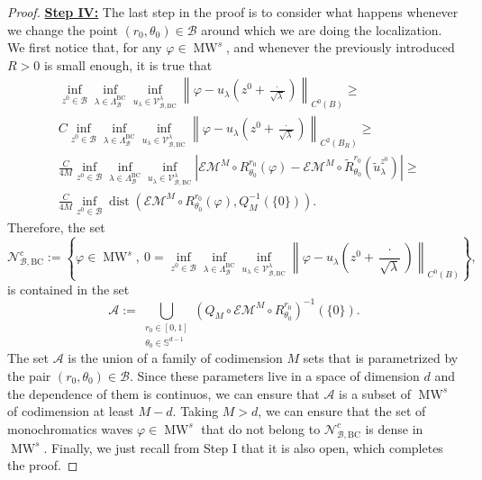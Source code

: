 \documentclass{amsart}
\theoremstyle{definition}
\theoremstyle{remark}
\newcommand{\vp}{\varphi}
\DeclareMathOperator\dist{dist} \DeclareMathOperator\diam{diam}
\renewcommand\geq\geqslant
\numberwithin{equation}{section}
\theoremstyle{definition}
\theoremstyle{remark}
\DeclareMathOperator\MW{MW}
\begin{document}
\begin{proof}
	 \textbf{	\underline{Step IV:}} The last step in the proof is to consider what happens whenever we change the point $(r_0,\theta_0)\in\mathcal{B}$ around which we are doing the localization.  We first notice that, for any $\varphi\in \MW^s$, and whenever the previously introduced $R>0$ is small enough, it is true that	\begin{equation}
		\begin{aligned}
			&\inf_{z^0\in\mathcal{B}}\inf_{\lambda\in\Lambda_{\mathcal{B}}^{\mathrm{BC}}}\inf_{u_\lambda \in\mathcal{V}_{\mathcal{B},\mathrm{BC}}^\lambda}\left\|\varphi-u_\lambda\left(z^0+\frac{\cdot}{\sqrt{\lambda}}\right)\right\|_{C^0\left(B\right)}\geq\\&C\inf_{z^0\in\mathcal{B}}\inf_{\lambda\in\Lambda_{\mathcal{B}}^{\mathrm{BC}}}\inf_{u_\lambda \in\mathcal{V}_{\mathcal{B},\mathrm{BC}}^\lambda}\left\|\varphi-u_\lambda\left(z^0+\frac{\cdot}{\sqrt{\lambda}}\right)\right\|_{C^2\left(B_R\right)}\geq\\&\frac{C}{4M}\inf_{z^0\in\mathcal{B}}\inf_{\lambda\in\Lambda_{\mathcal{B}}^{\mathrm{BC}}}\inf_{u_\lambda \in\mathcal{V}_{\mathcal{B},\mathrm{BC}}^\lambda}\left|\mathcal{EM}^M\circ R_{\theta_0}^{r_0}\left(\varphi\right)-\mathcal{EM}^M\circ\tilde{R}_{\theta_0}^{r_0}\left(\tilde{u}_\lambda^{z^0}\right)\right|\geq\\ &\frac{C}{4M}\inf_{z^0\in\mathcal{B}} \dist\left(\mathcal{EM}^M\circ R_{\theta_0}^{r_0}(\varphi),Q_M^{-1}\left(\{0\}\right)\right).
		\end{aligned}
	\end{equation}
  Therefore, the set \begin{equation}
      \mathcal{N}_{\mathcal B,\mathrm{BC}}^c:=\left\{\varphi\in \MW^s,\ 0=\inf_{z^0\in\mathcal{B}}\inf_{\lambda\in\Lambda_{\mathcal{B}}^{\mathrm{BC}}}\inf_{u_\lambda \in\mathcal{V}_{\mathcal{B},\mathrm{BC}}^\lambda}\left\|\varphi-u_\lambda\left(z^0+\frac{\cdot}{\sqrt{\lambda}}\right)\right\|_{C^0\left(B\right)}\right\},
  \end{equation}is contained in the set \begin{equation}\mathcal{A}:=\bigcup_{\substack{r_0\in[0,1]\\\theta_0\in\mathbb{S}^{d-1}}}\left(Q_M\circ\mathcal{EM}^M\circ R_{\theta_0}^{r_0}\right)^{-1}\left(\{0\}\right).\end{equation} The set $\mathcal{A}$ is the union of a family of codimension $M$ sets that is parametrized by the pair $(r_0,\theta_0)\in\mathcal{B}$. Since these parameters live in a space of dimension $d$ and the dependence of them is continuos, we can ensure that $\mathcal{A}$ is a subset of $\MW^s$ of codimension at least $M-d$. Taking $M>d$, we can ensure that the set of monochromatics waves $\vp\in\MW^s$ that do not belong to $ \mathcal{N}_{\mathcal B,\mathrm{BC}}^c$ is dense in $\MW^s$.  Finally, we just recall from Step I that it is also open, which completes the proof.\end{proof}
\end{document}
